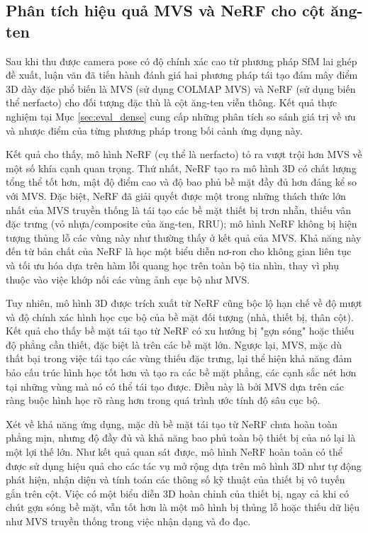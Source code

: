 \subsection{Phân tích hiệu quả MVS và NeRF cho cột ăng-ten}
\label{subsec:discuss_mvs_nerf}

Sau khi thu được camera pose có độ chính xác cao từ phương pháp SfM lai ghép đề xuất, luận văn đã tiến hành đánh giá hai phương pháp tái tạo đám mây điểm 3D dày đặc phổ biến là MVS (sử dụng COLMAP MVS) và NeRF (sử dụng biến thể nerfacto) cho đối tượng đặc thù là cột ăng-ten viễn thông. Kết quả thực nghiệm tại Mục \ref{sec:eval_dense} cung cấp những phân tích so sánh giá trị về ưu và nhược điểm của từng phương pháp trong bối cảnh ứng dụng này.

Kết quả cho thấy, mô hình NeRF (cụ thể là nerfacto) tỏ ra vượt trội hơn MVS về một số khía cạnh quan trọng. Thứ nhất, NeRF tạo ra mô hình 3D có chất lượng tổng thể tốt hơn, mật độ điểm cao và độ bao phủ bề mặt đầy đủ hơn đáng kể so với MVS. Đặc biệt, NeRF đã giải quyết được một trong những thách thức lớn nhất của MVS truyền thống là tái tạo các bề mặt thiết bị trơn nhẵn, thiếu vân đặc trưng (vỏ nhựa/composite của ăng-ten, RRU); mô hình NeRF không bị hiện tượng thủng lỗ các vùng này như thường thấy ở kết quả của MVS. Khả năng này đến từ bản chất của NeRF là học một biểu diễn nơ-ron cho không gian liên tục và tối ưu hóa dựa trên hàm lỗi quang học trên toàn bộ tia nhìn, thay vì phụ thuộc vào việc khớp nối các vùng ảnh cục bộ như MVS.

Tuy nhiên, mô hình 3D được trích xuất từ NeRF cũng bộc lộ hạn chế về độ mượt và độ chính xác hình học cục bộ của bề mặt đối tượng (nhà, thiết bị, thân cột). Kết quả cho thấy bề mặt tái tạo từ NeRF có xu hướng bị "gợn sóng" hoặc thiếu độ phẳng cần thiết, đặc biệt là trên các bề mặt lớn. Ngược lại, MVS, mặc dù thất bại trong việc tái tạo các vùng thiếu đặc trưng, lại thể hiện khả năng đảm bảo cấu trúc hình học tốt hơn và tạo ra các bề mặt phẳng, các cạnh sắc nét hơn tại những vùng mà nó có thể tái tạo được. Điều này là bởi MVS dựa trên các ràng buộc hình học rõ ràng hơn trong quá trình ước tính độ sâu cục bộ.

Xét về khả năng ứng dụng, mặc dù bề mặt tái tạo từ NeRF chưa hoàn toàn phẳng mịn, nhưng độ đầy đủ và khả năng bao phủ toàn bộ thiết bị của nó lại là một lợi thế lớn. Như kết quả quan sát được, mô hình NeRF hoàn toàn có thể được sử dụng hiệu quả cho các tác vụ mở rộng dựa trên mô hình 3D như tự động phát hiện, nhận diện và tính toán các thông số kỹ thuật của thiết bị vô tuyến gắn trên cột. Việc có một biểu diễn 3D hoàn chỉnh của thiết bị, ngay cả khi có chút gợn sóng bề mặt, vẫn tốt hơn là một mô hình bị thủng lỗ hoặc thiếu dữ liệu như MVS truyền thống trong việc nhận dạng và đo đạc.

